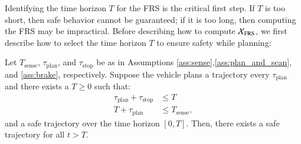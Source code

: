 Identifying the time horizon $T$ for the FRS is the critical first step.
If $T$ is too short, then safe behavior cannot be guaranteed; if it is too long, then computing the FRS may be impractical.
Before describing how to compute $\mathcal{X}_\text{FRS}$, we first describe how to select the time horizon $T$ to ensure safety while planning:
\begin{thm}\label{thm:time_horizon}
Let $T_\text{sense}$, $\tau_\text{plan}$, and $\tau_\text{stop}$ be as in Assumptions \ref{ass:sense},\ref{ass:plan_and_scan}, and \ref{ass:brake}, respectively.
Suppose the vehicle plans a trajectory every $\tau_\text{plan}$ and there exists a $ T \geq 0$ such that:
\begin{align}
\tau_\text{plan} + \tau_\text{stop} &\leq T  \\
T + \tau_\text{plan} &\leq T_\text{sense},
\end{align}
and a safe trajectory over the time horizon $[0,T]$. Then, there exists a safe trajectory for all $t > T$.
\end{thm}

